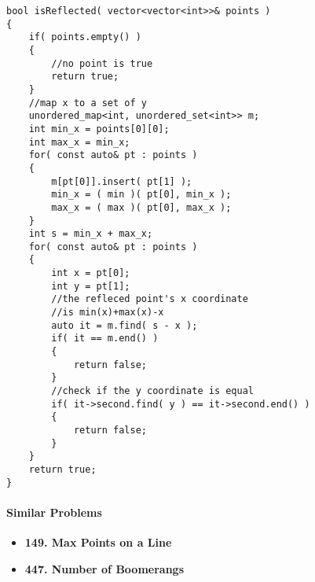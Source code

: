 \setcounter{lstlisting}{0}
\begin{lstlisting}[style=customc, caption={Hash Map}]
bool isReflected( vector<vector<int>>& points )
{
    if( points.empty() )
    {
        //no point is true
        return true;
    }
    //map x to a set of y
    unordered_map<int, unordered_set<int>> m;
    int min_x = points[0][0];
    int max_x = min_x;
    for( const auto& pt : points )
    {
        m[pt[0]].insert( pt[1] );
        min_x = ( min )( pt[0], min_x );
        max_x = ( max )( pt[0], max_x );
    }
    int s = min_x + max_x;
    for( const auto& pt : points )
    {
        int x = pt[0];
        int y = pt[1];
        //the refleced point's x coordinate
        //is min(x)+max(x)-x
        auto it = m.find( s - x );
        if( it == m.end() )
        {
            return false;
        }
        //check if the y coordinate is equal
        if( it->second.find( y ) == it->second.end() )
        {
            return false;
        }
    }
    return true;
}
\end{lstlisting}

\paragraph{Similar Problems}
\begin{itemize}
\item \textbf{149. Max Points on a Line}
\item \textbf{447. Number of Boomerangs}
\end{itemize}